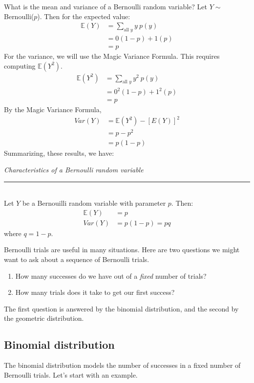 \documentclass[12pt]{article}
\theoremstyle{definition}
\theoremstyle{remark}
\def\E{{\mathbb E}}
\begin{document}
What is the mean and variance of a Bernoulli random variable? Let $Y \sim$ Bernoulli($p$). Then for the expected value:
\begin{align*}
\E(Y) &= \sum_{\text{all }y}y\:p(y) \\
&= 0(1 - p) + 1(p) \\
&= p
\end{align*}
For the variance, we will use the Magic Variance Formula. This requires computing $\E(Y^2)$.
\begin{align*}
\E(Y^2) &= \sum_{\text{all }y}y^2\:p(y) \\
&= 0^2(1 - p) + 1^2(p) \\
&= p
\end{align*}
By the Magic Variance Formula,
\begin{align*}
Var(Y) &= \E(Y^2) - [E(Y)]^2 \\
&= p - p^2 \\
&= p(1-p)
\end{align*}
Summarizing, these results, we have:
\begin{framed}
  \emph{Characteristics of a Bernoulli random variable}\\
  \rule{\dimexpr{}\fboxrule}{.1pt} \\
Let $Y$ be a Bernouilli random variable with parameter $p$. Then:
\begin{align*}
\E(Y) &= p \\
Var(Y) &= p(1-p) = pq
\end{align*}
where $q = 1-p$.
\end{framed}

Bernoulli trials are useful in many situations. Here are two questions we might want to ask about a sequence of Bernoulli trials.

\begin{enumerate}
\item How many successes do we have out of a \emph{fixed} number of trials?
\item How many trials does it take to get our first success?
\end{enumerate}

The first question is answered by the binomial distribution, and the second by the geometric distribution.

\subsection{Binomial distribution}

The binomial distribution models the number of successes in a fixed number of Bernoulli trials. Let's start with an example.
\end{document}
